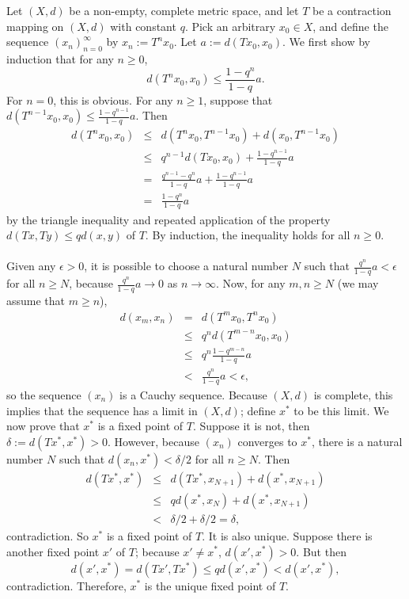 \documentclass[12pt]{article}
\begin{document}
Let $(X,d)$ be a non-empty, complete metric space, and let $T$ be a
contraction mapping on $(X,d)$ with constant $q$.  Pick an arbitrary
$x_0 \in X$, and define the sequence $(x_n)_{n=0}^{\infty}$ by
$x_n:=T^nx_0$.  Let $a:=d(Tx_0,x_0)$.  We first show by induction that
for any $n\ge 0$,
$$
d(T^nx_0,x_0)\le\frac{1-q^n}{1-q} a.
$$
For $n=0$, this is obvious.  For any $n\ge 1$, suppose that
$d(T^{n-1}x_0,x_0)\le\frac{1-q^{n-1}}{1-q}a$. Then
\begin{eqnarray*}
d(T^nx_0,x_0)&\le&d(T^nx_0,T^{n-1}x_0)+d(x_0,T^{n-1}x_0)\\
&\le&q^{n-1}d(Tx_0,x_0)+\frac{1-q^{n-1}}{1-q}a\\
&=&\frac{q^{n-1}-q^n}{1-q}a+\frac{1-q^{n-1}}{1-q}a\\
&=&\frac{1-q^n}{1-q}a
\end{eqnarray*}
by the triangle inequality and repeated application of the property
$d(Tx,Ty)\le qd(x,y)$ of $T$.  By induction, the inequality holds for
all $n \ge 0$.\\
\\
Given any $\epsilon>0$, it is possible to choose a natural number $N$
such that $\frac{q^n}{1-q}a<\epsilon$ for all $n\ge N$, because
$\frac{q^n}{1-q}a\to 0$ as $n\to\infty$.  Now, for any $m,n\ge N$ (we
may assume that $m\ge n$),
\begin{eqnarray*}
d(x_m,x_n)&=&d(T^mx_0,T^nx_0)\\
&\le&q^nd(T^{m-n}x_0,x_0)\\
&\le&q^n\frac{1-q^{m-n}}{1-q}a\\
&<&\frac{q^n}{1-q}a<\epsilon,
\end{eqnarray*}
so the sequence $(x_n)$ is a Cauchy sequence.  Because $(X,d)$ is
complete, this implies that the sequence has a limit in $(X,d)$;
define $x^*$ to be this limit.  We now prove that $x^*$ is a fixed
point of $T$.  Suppose it is not, then $\delta:=d(Tx^*,x^*)>0$.
However, because $(x_n)$ converges to $x^*$,  there is a natural
number $N$ such that $d(x_n,x^*)<\delta/2$ for all $n\ge N$.  Then
\begin{eqnarray*}
d(Tx^*,x^*)&\le&d(Tx^*,x_{N+1})+d(x^*,x_{N+1})\\
&\le&qd(x^*,x_N)+d(x^*,x_{N+1})\\
&<&\delta/2+\delta/2=\delta,
\end{eqnarray*}
contradiction.  So $x^*$ is a fixed point of $T$.  It is also unique.
Suppose there is another fixed point $x'$ of $T$; because $x'\neq
x^*$, $d(x',x^*)>0$.  But then
$$
d(x',x^*)=d(Tx',Tx^*)\le qd(x',x^*)<d(x',x^*),
$$
contradiction.  Therefore, $x^*$ is the unique fixed point of $T$.
\end{document}
